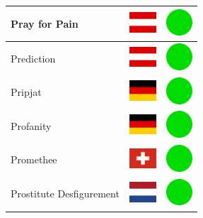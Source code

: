 \documentclass[12pt, a4paper, twoside]{report}
\begin{document}
\begin{center}
\begin{longtable}{|p{5cm}|p{2cm}|p{2cm}|}
 Pray for Pain                                              & \includegraphics[width=1cm]{../4x3/at} &   \includegraphics[width=1cm]{../likes/y} \\ \hline
 Prediction                                                 & \includegraphics[width=1cm]{../4x3/at} &   \includegraphics[width=1cm]{../likes/y} \\ \hline
 Pripjat                                                    & \includegraphics[width=1cm]{../4x3/de} &   \includegraphics[width=1cm]{../likes/y} \\ \hline
 Profanity                                                  & \includegraphics[width=1cm]{../4x3/de} &   \includegraphics[width=1cm]{../likes/y} \\ \hline
 Promethee                                                  & \includegraphics[width=1cm]{../4x3/ch} &   \includegraphics[width=1cm]{../likes/y} \\ \hline
 Prostitute Desfigurement                                   & \includegraphics[width=1cm]{../4x3/nl} &   \includegraphics[width=1cm]{../likes/y} \\ \hline

\end{longtable}
\end{center}
\end{document}
